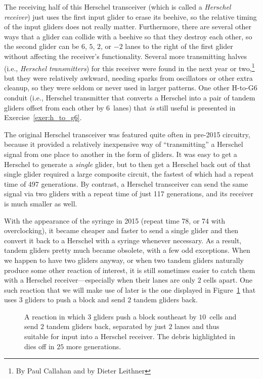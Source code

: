 The receiving half of this Herschel transceiver (which is called a \emph{Herschel receiver}) just uses the first input glider to erase its beehive, so the relative timing of the input gliders does not really matter. Furthermore, there are several other ways that a glider can collide with a beehive so that they destroy each other, so the second glider can be $6$, $5$, $2$, or $-2$ lanes to the right of the first glider without affecting the receiver's functionality. Several more transmitting halves (i.e., \emph{Herschel transmitters}) for this receiver were found in the next year or two,\footnote{By Paul Callahan and by Dieter Leithner} but they were relatively awkward, needing sparks from oscillators or other extra cleanup, so they were seldom or never used in larger patterns. One other H-to-G6 conduit (i.e., Herschel transmitter that converts a Herschel into a pair of tandem gliders offset from each other by $6$~lanes) that \emph{is} still useful is presented in Exercise~\ref{exer:h_to_g6}.

The original Herschel transceiver was featured quite often in pre-2015 circuitry, because it provided a relatively inexpensive way of ``transmitting'' a Herschel signal from one place to another in the form of gliders. It was easy to get a Herschel to generate a \emph{single} glider, but to then get a Herschel back out of that single glider required a large composite circuit, the fastest of which had a repeat time of 497 generations. By contrast, a Herschel transceiver can send the same signal via two gliders with a repeat time of just 117 generations, and its receiver is much smaller as well.

With the appearance of the syringe in 2015 (repeat time 78, or 74 with overclocking), it became cheaper and faster to send a single glider and then convert it back to a Herschel with a syringe whenever necessary. As a result, tandem gliders pretty much became obsolete, with a few odd exceptions. When we happen to have two gliders anyway, or when two tandem gliders naturally produce some other reaction of interest, it is still sometimes easier to catch them with a Herschel receiver---especially when their lanes are only $2$ cells apart. One such reaction that we will make use of later is the one displayed in Figure~\ref{fig:block_pusher} that uses $3$ gliders to push a block and send $2$ tandem gliders back.

\begin{figure}[!htb]
	\centering{}
	\caption{A reaction in which $3$ gliders push a block southeast by $10$~cells and send $2$ tandem gliders back, separated by just $2$ lanes and thus suitable for input into a Herschel receiver. The debris highlighted in  dies off in $25$ more generations.}\label{fig:block_pusher}
\end{figure}

